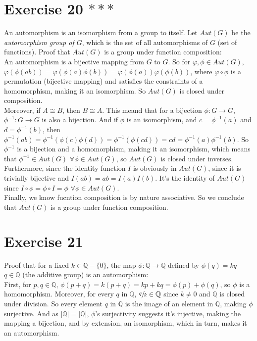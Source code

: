 \documentclass{article}
\newcommand{\Q}{\mathbb{Q}}
\begin{document}
    \section*{Exercise 20 $***$}
    An automorphism is an isomorphism from a group to itself.
    Let $Aut(G)$ be the \textit{automorphism group of $G$},
    which is the set of all automorphisms of $G$ (set of functions).
    Proof that $Aut(G)$ is a group under function composition: \\
    An automorphism is a bijective mapping from $G$ to $G$.
    So for $\varphi, \phi \in Aut(G)$,
    $\varphi(\phi(ab)) = \varphi(\phi(a)\phi(b))
    = \varphi(\phi(a))\varphi(\phi(b))$,
    where $\varphi \circ \phi$ is a permutation (bijective mapping)
    and satisfies the constraints of a homomorphism, making it an
    isomorphism.
    So $Aut(G)$ is closed under composition. \\ 
    Moreover, if $A \cong B$, then $B \cong A$.
    This meand that for a bijection $\phi: G \to G$,
    $\phi^{-1}: G \to G$ is also a bijection.
    And if $\phi$ is an isomorphism,
    and $c = \phi^{-1}(a)$ and $d = \phi^{-1}(b)$,
    then $\phi^{-1}(ab) = \phi^{-1}(\phi(c)\phi(d))
    = \phi^{-1}(\phi(cd))
    = cd
    = \phi^{-1}(a)\phi^{-1}(b)$.
    So $\phi^{-1}$ is a bijection and a homomorphism, 
    making it an isomorphism,
    which means that $\phi^{-1} \in Aut(G)$ $\forall \phi \in Aut(G)$,
    so $Aut(G)$ is closed under inverses. \\
    Furthermore, since the identity function $I$ is obviously in $Aut(G)$,
    since it is trivially bijective
    and $I(ab) = ab = I(a)I(b)$.
    It's the identity of $Aut(G)$
    since $I \circ \phi = \phi \circ I = \phi$ $\forall \phi \in Aut(G)$. \\
    Finally, we know fucntion composition is by nature associative.
    So we conclude that $Aut(G)$ is a group under function composition.


    \section*{Exercise 21}
    Proof that for a fixed $k \in \Q - \{0\}$,
    the map $\phi : \Q \to \Q$ defined by $\phi(q) = kq$ $q \in \Q$ 
    (the additive group) is an automorphism: \\
    First, for $p, q \in \Q$,
    $\phi(p + q) = k(p + q) = kp + kq = \phi(p) + \phi(q)$,
    so $\phi$ is a homomorphism.
    Moreover, for every $q$ in $\Q$, $\sfrac{q}{k} \in \Q$
    since $k \neq 0$ and $\Q$ is closed under division.
    So every element $q$ in $\Q$ is the image of an element in $\Q$,
    making $\phi$ surjective.
    And as $|\Q| = |\Q|$, $\phi$'s surjectivity suggests it's injective,
    making the mapping a bijection,
    and by extension, an isomorphism,
    which in turn, makes it an automorphism.
\end{document}
